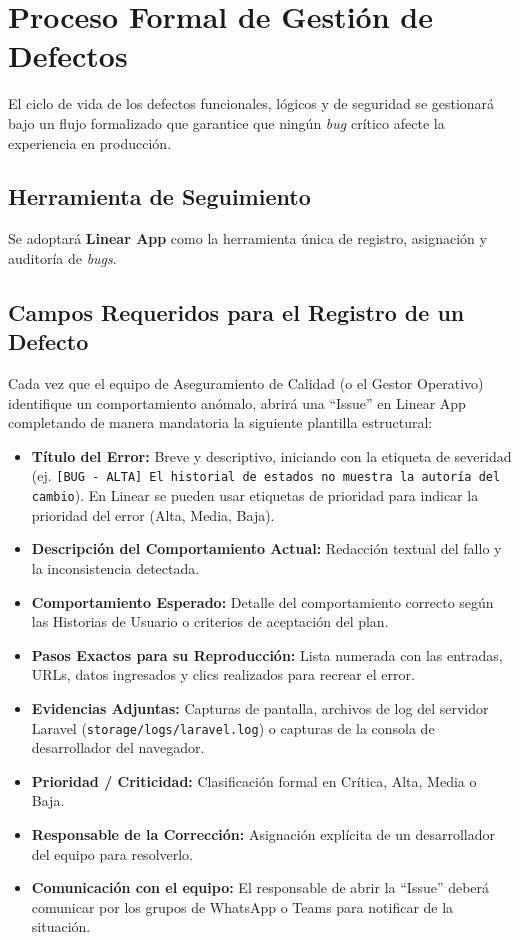 \section{Proceso Formal de Gestión de Defectos}

El ciclo de vida de los defectos funcionales, lógicos y de seguridad se gestionará bajo un flujo formalizado que garantice que ningún \textit{bug} crítico afecte la experiencia en producción.

\subsection{Herramienta de Seguimiento}
Se adoptará \textbf{Linear App} como la herramienta única de registro, asignación y auditoría de \textit{bugs}.

\subsection{Campos Requeridos para el Registro de un Defecto}
Cada vez que el equipo de Aseguramiento de Calidad (o el Gestor Operativo) identifique un comportamiento anómalo, abrirá una ``Issue'' en Linear App completando de manera mandatoria la siguiente plantilla estructural:

\begin{itemize}
    \item \textbf{Título del Error:} Breve y descriptivo, iniciando con la etiqueta de severidad (ej. \texttt{[BUG - ALTA] El historial de estados no muestra la autoría del cambio}). En Linear se pueden usar etiquetas de prioridad para indicar la prioridad del error (Alta, Media, Baja).
    \item \textbf{Descripción del Comportamiento Actual:} Redacción textual del fallo y la inconsistencia detectada.
    \item \textbf{Comportamiento Esperado:} Detalle del comportamiento correcto según las Historias de Usuario o criterios de aceptación del plan.
    \item \textbf{Pasos Exactos para su Reproducción:} Lista numerada con las entradas, URLs, datos ingresados y clics realizados para recrear el error.
    \item \textbf{Evidencias Adjuntas:} Capturas de pantalla, archivos de log del servidor Laravel (\texttt{storage/logs/laravel.log}) o capturas de la consola de desarrollador del navegador.
    \item \textbf{Prioridad / Criticidad:} Clasificación formal en Crítica, Alta, Media o Baja.
    \item \textbf{Responsable de la Corrección:} Asignación explícita de un desarrollador del equipo para resolverlo.
    \item \textbf{Comunicación con el equipo:} El responsable de abrir la ``Issue'' deberá comunicar por los grupos de WhatsApp o Teams para notificar de la situación.
\end{itemize}

